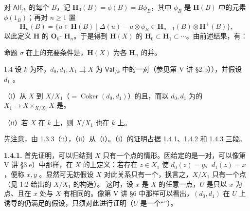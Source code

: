 对 $\mathsf{Alf}_{/k}$ 的每个 $B$，记 $\mathbf H_0(B)=\phi(B)=B\phi_B$，其中 $\phi_B$ 是 $\mathbf H(B)$ 中的元素 $\phi(1_B)$；再对 $n\geq1$ 置
\[
 \mathbf H_n(B)=\{u\in\mathbf H(B)\mid\Delta(u)-u\otimes\phi_B\in\mathbf H_{n-1}(B)\otimes\mathbf H^+(B)\},
\]
以此定义 $\mathbf H$ 的 $\mathbf O_k$- $\mathbf H_n$。于是得到 $\mathbf H(X)$ 的 $\mathbf H_0\subset\mathbf H_1\subset\cdots$。由前述结果，有：
\begin{SGAresult}{命题}{}
$\sigma$ 在上的充要条件是，$\mathbf H(X)$ 为各 $\mathbf H_n$ 的并。
\end{SGAresult}

\begin{SGAresult}{}{1.4}
设 $k$ 为环，$d_0,d_1:X_1\rightrightarrows X$ 为 $\mathsf{Vaf}_{/k}$ 中的一对（参见第 V 讲 \S2.b）），并假设 $d_1$ 。

（i）从 $X$ 到 $X/X_1$（$=\operatorname{Coker}(d_0,d_1)$）的且，而以 $d_0,d_1$ 为的 $X_1\to X\times_{X/X_1}X$ 是。

（ii）若 $X$ 在 $k$ 上，则 $X/X_1$ 也在 $k$ 上。
\end{SGAresult}
先注意，由 1.3.3（ii），（ii）从（i）。（i）的证明占据 1.4.1、1.4.2 和 1.4.3 三段。

\textbf{1.4.1.} 首先证明，可以归结到 $X$ 只有一个点的情形。因给定的是一对，可以像第 V 讲 \S3.e）中那样，在 $X$ 的上定义：若存在 $z\in X_1$ 使 $d_0(z)=y$、$d_1(z)=x$，便称 $x,y$ 。显然可无妨假设 $X$ 对此关系只有一个，换言之，$X/X_1$ 只有一个点（见 1.2 给出的 $X/X_1$ 的构造）。
这时，设 $x$ 是 $X$ 的任意一点，$U$ 是只以 $x$ 为点、且在 $x$ 处与 $X$ 有相同的。像第 V 讲 \S6 中那样可以看出，$(d_0,d_1)$ 在 $U$ 上诱导的仍满足的假设，只须对此进行证明（$U$ 是一个“”）。

